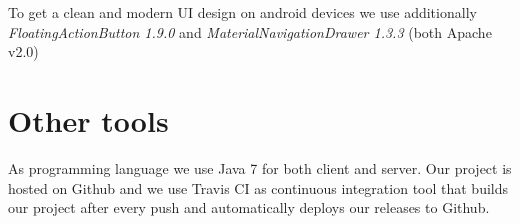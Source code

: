 \documentclass[ngerman, 10pt, a4paper]{scrartcl}
\begin{document}
To get a clean and modern UI design on android devices we use additionally \emph{FloatingActionButton 1.9.0} \cite{AFAB} and \emph{MaterialNavigationDrawer 1.3.3} \cite{MND} (both Apache v2.0)

\section{Other tools}
As programming language we use Java 7 for both client and server. Our project is hosted on Github \cite{github} and we use Travis CI \cite{Travis} as continuous integration tool that builds our project after every push and automatically deploys our releases to Github.

{\small


}
\end{document}
